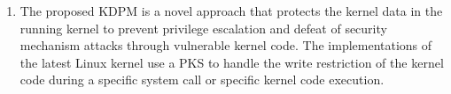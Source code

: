 




\begin{enumerate}%
\item The proposed KDPM is a novel approach that protects the kernel data in the
running kernel to prevent privilege escalation and defeat of security mechanism
attacks through vulnerable kernel code.
%
The implementations of the latest Linux kernel use a PKS to handle the write restriction
of the kernel code during a specific system call or specific kernel code execution.

% 



\end{enumerate}
